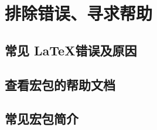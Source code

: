 \chapter{排除错误、寻求帮助}

\leavevmode\nobreakspace

\section{常见 \LaTeX 错误及原因}

\leavevmode\nobreakspace

\section{查看宏包的帮助文档}

\leavevmode\nobreakspace

\section{常见宏包简介}

\leavevmode\nobreakspace

\endinput